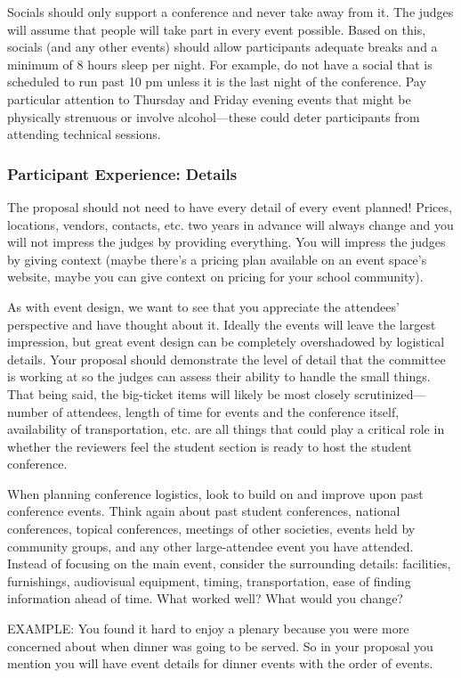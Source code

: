\documentclass[12pt]{article}
\begin{document}
Socials should only support a conference and never take away from it. The judges will assume that people will take part in every event possible. Based on this, socials (and any other events) should allow participants adequate breaks and a minimum of 8 hours sleep per night. For example, do not have a social that is scheduled to run past 10 pm unless it is the last night of the conference. Pay particular attention to Thursday and Friday evening events that might be physically strenuous or involve alcohol---these could deter participants from attending technical sessions.

\subsubsection{Participant Experience: Details}
The proposal should not need to have every detail of every event planned! Prices, locations, vendors, contacts, etc. two years in advance will always change and you will not impress the judges by providing everything. You will impress the judges by giving context (maybe there's a pricing plan available on an event space's website, maybe you can give context on pricing for your school community).

As with event design, we want to see that you appreciate the attendees’ perspective and have thought about it. Ideally the events will leave the largest impression, but great event design can be completely overshadowed by logistical details. Your proposal should demonstrate the level of detail that the committee is working at so the judges can assess their ability to handle the small things. That being said, the big-ticket items will likely be most closely scrutinized---number of attendees, length of time for events and the conference itself, availability of transportation, etc. are all things that could play a critical role in whether the reviewers feel the student section is ready to host the student conference.

When planning conference logistics, look to build on and improve upon past conference events. Think again about past student conferences, national conferences, topical conferences, meetings of other societies, events held by community groups, and any other large-attendee event you have attended. Instead of focusing on the main event, consider the surrounding details: facilities, furnishings, audiovisual equipment, timing, transportation, ease of finding information ahead of time. What worked well? What would you change?

EXAMPLE: You found it hard to enjoy a plenary because you were more concerned about when dinner was going to be served. So in your proposal you mention you will have event details for dinner events with the order of events.
\end{document}
